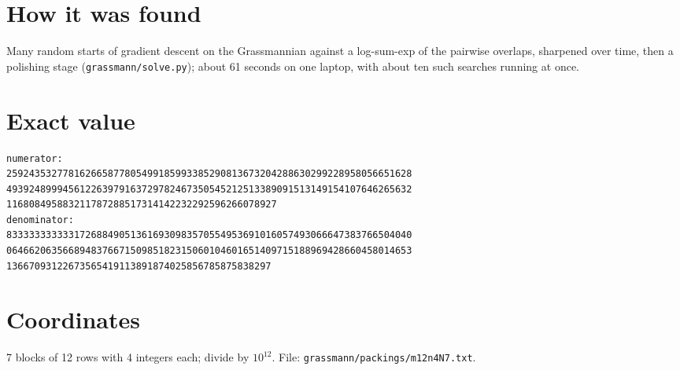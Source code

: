 \documentclass[11pt,a4paper]{article}
\begin{document}
\section{How it was found}
Many random starts of gradient descent on the Grassmannian against a log-sum-exp of the pairwise overlaps, sharpened over time, then a polishing stage (\texttt{grassmann/solve.py}); about 61 seconds on one laptop, with about ten such searches running at once.


\appendix
\section{Exact value}
{\small
\begin{verbatim}
numerator:
259243532778162665877805499185993385290813673204288630299228958056651628
493924899945612263979163729782467350545212513389091513149154107646265632
116808495883211787288517314142232292596266078927
denominator:
833333333333172688490513616930983570554953691016057493066647383766504040
064662063566894837667150985182315060104601651409715188969428660458014653
13667093122673565419113891874025856785875838297
\end{verbatim}}

\section{Coordinates}
7 blocks of 12 rows with 4 integers each; divide by $10^{12}$. File: \texttt{grassmann/packings/m12n4N7.txt}.
{\tiny
\begin{multicols}{3}
\end{multicols}}
\end{document}
